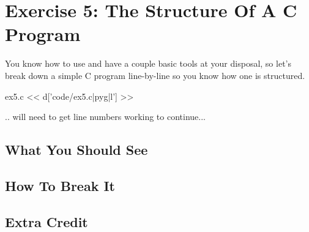\chapter{Exercise 5: The Structure Of A C Program}

You know how to use  and have a couple basic tools
at your disposal, so let's break down a simple C program line-by-line
so you know how one is structured.

\begin{code}{ex5.c}
<< d['code/ex5.c|pyg|l'] >>
\end{code}

.. will need to get line numbers working to continue...

\section{What You Should See}


\section{How To Break It}


\section{Extra Credit}



